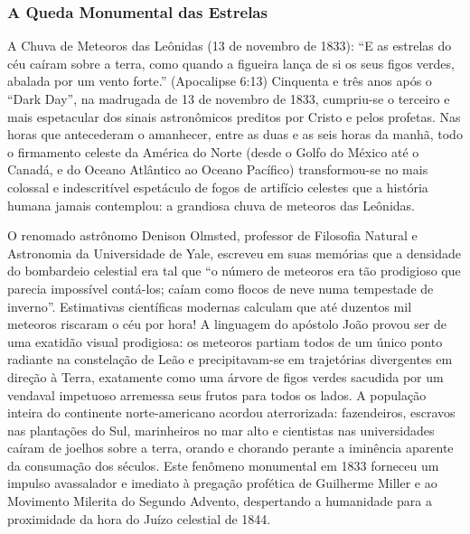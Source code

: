\subsubsection*{A Queda Monumental das Estrelas}
A Chuva de Meteoros das Leônidas (13 de novembro de 1833):
``E as estrelas do céu caíram sobre a terra, como quando a figueira lança de si os seus figos verdes, abalada por um vento forte.'' (Apocalipse 6:13)
Cinquenta e três anos após o ``Dark Day'', na madrugada de 13 de novembro de 1833, cumpriu-se o terceiro e mais espetacular dos sinais astronômicos preditos por Cristo e pelos profetas.
Nas horas que antecederam o amanhecer, entre as duas e as seis horas da manhã, todo o firmamento celeste da América do Norte (desde o Golfo do México até o Canadá, e do Oceano Atlântico ao Oceano Pacífico) transformou-se no mais colossal e indescritível espetáculo de fogos de artifício celestes que a história humana jamais contemplou: a grandiosa chuva de meteoros das Leônidas.

O renomado astrônomo Denison Olmsted, professor de Filosofia Natural e Astronomia da Universidade de Yale, escreveu em suas memórias que a densidade do bombardeio celestial era tal que ``o número de meteoros era tão prodigioso que parecia impossível contá-los; caíam como flocos de neve numa tempestade de inverno''. Estimativas científicas modernas calculam que até duzentos mil meteoros riscaram o céu por hora!
A linguagem do apóstolo João provou ser de uma exatidão visual prodigiosa: os meteoros partiam todos de um único ponto radiante na constelação de Leão e precipitavam-se em trajetórias divergentes em direção à Terra, exatamente como uma árvore de figos verdes sacudida por um vendaval impetuoso arremessa seus frutos para todos os lados. A população inteira do continente norte-americano acordou aterrorizada: fazendeiros, escravos nas plantações do Sul, marinheiros no mar alto e cientistas nas universidades caíram de joelhos sobre a terra, orando e chorando perante a iminência aparente da consumação dos séculos. Este fenômeno monumental em 1833 forneceu um impulso avassalador e imediato à pregação profética de Guilherme Miller e ao Movimento Milerita do Segundo Advento, despertando a humanidade para a proximidade da hora do Juízo celestial de 1844.


